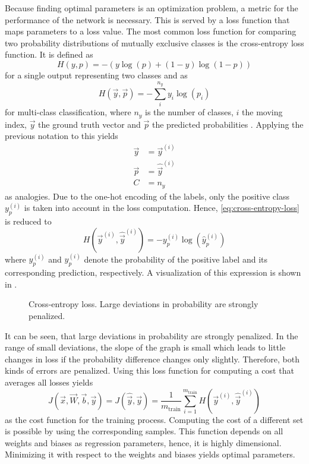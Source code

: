 Because finding optimal parameters is an optimization problem, a metric for the performance of the network is necessary.
This is served by a loss function that maps parameters to a loss value.
The most common loss function for comparing two probability distributions of mutually exclusive classes is the cross-entropy loss function.
It is defined as
\begin{equation}
	H(y,p) = -(y \log(p) + (1-y) \log(1-p))
\end{equation}
for a single output representing two classes and as
\begin{equation}
	\label{eq:cross-entropy-loss}
	H(\vec{y}, \vec{p}) = - \sum_{i}^{n_y} y_i \log (p_i)
\end{equation}
for multi-class classification, where $n_y$ is the number of classes, $i$ the moving index, $\vec{y}$ the ground truth vector and $\vec{p}$ the predicted probabilities \cite{murphy2013machine}.
Applying the previous notation to this yields
\begin{subequations}
	\begin{align}
		\vec{y} &= \vec{y}^{(i)} \\
		\vec{p} &= \hat{\vec{y}}^{(i)} \\
		C &= n_y
	\end{align}
\end{subequations}
as analogies.
Due to the one-hot encoding of the labels, only the positive class $y_p^{(i)}$ is taken into account in the loss computation.
Hence, \eqref{eq:cross-entropy-loss} is reduced to
\begin{equation}
	\label{eq:cross-entropy-loss-compact}
	H(\vec{y}^{(i)}, \hat{\vec{y}}^{(i)}) = - y_p^{(i)} \log (\hat{y}_p^{(i)})
\end{equation}
where $y_p^{(i)}$ and $\hat{y}_p^{(i)}$ denote the probability of the positive label and its corresponding prediction, respectively.
A visualization of this expression is shown in .
\begin{figure}
	\setlength{}
	\setlength{}
	\centering
	
	\caption[Cross-entropy loss]{Cross-entropy loss. Large deviations in probability are strongly penalized.}
	\label{fig:cross-entropy}
\end{figure}
It can be seen, that large deviations in probability are strongly penalized.
In the range of small deviations, the slope of the graph is small which leads to little changes in loss if the probability difference changes only slightly.
Therefore, both kinds of errors are penalized.
Using this loss function for computing a cost that averages all losses yields
\begin{equation}
	\label{eq:cross-entropy-cost}
	J(\vec{x}, \vec{W}, \vec{b}, \vec{y}) = J(\hat{\vec{y}}, \vec{y}) = \frac{1}{m_{\text{train}}} \sum_{i=1}^{m_{\text{train}}} H(\vec{y}^{(i)}, \hat{\vec{y}}^{(i)})
\end{equation}
as the cost function for the training process.
Computing the cost of a different set is possible by using the corresponding samples.
This function depends on all weights and biases as regression parameters, hence, it is highly dimensional.
Minimizing it with respect to the weights and biases yields optimal parameters.